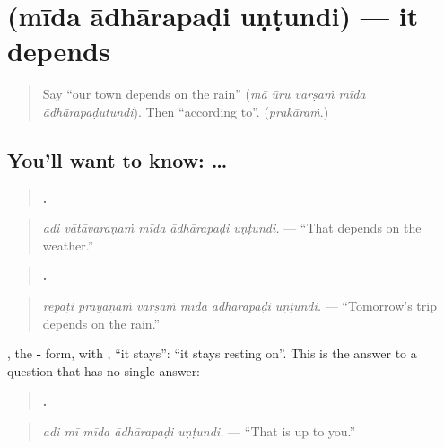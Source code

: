 \section[\texorpdfstring{\te{మీద} \te{ఆధారపడి} \te{ఉంటుంది} (mīda ādhārapaḍi …)}{మీద ఆధారపడి ఉంటుంది (mīda ādhārapaḍi …)}]{   (mīda ādhārapaḍi uṇṭundi) — it depends}

\label{lesson:TE-C325-adharapadi-untundi}



\begin{quote}
Say \textquotedblleft{}our town depends on the rain\textquotedblright{} (\emph{mā ūru varṣaṁ mīda ādhārapaḍutundi}). Then \textquotedblleft{}according to\textquotedblright{}. (\emph{prakāraṁ}.)
\end{quote}

\subsection*{You'll want to know: …   }
\begin{quote}
\textbf{    .}
\end{quote}

\begin{quote}
\emph{adi vātāvaraṇaṁ mīda ādhārapaḍi uṇṭundi.} — \textquotedblleft{}That depends on the weather.\textquotedblright{}
\end{quote}

\begin{quote}
\textbf{     .}
\end{quote}

\begin{quote}
\emph{rēpaṭi prayāṇaṁ varṣaṁ mīda ādhārapaḍi uṇṭundi.} — \textquotedblleft{}Tomorrow's trip depends on the rain.\textquotedblright{}
\end{quote}

\textbf{}, the \textbf{-} form, with \textbf{}, \textquotedblleft{}it stays\textquotedblright{}: \textquotedblleft{}it stays resting on\textquotedblright{}. This is the answer to a question that has no single answer:

\begin{quote}
\textbf{    .}
\end{quote}

\begin{quote}
\emph{adi mī mīda ādhārapaḍi uṇṭundi.} — \textquotedblleft{}That is up to you.\textquotedblright{}
\end{quote}

